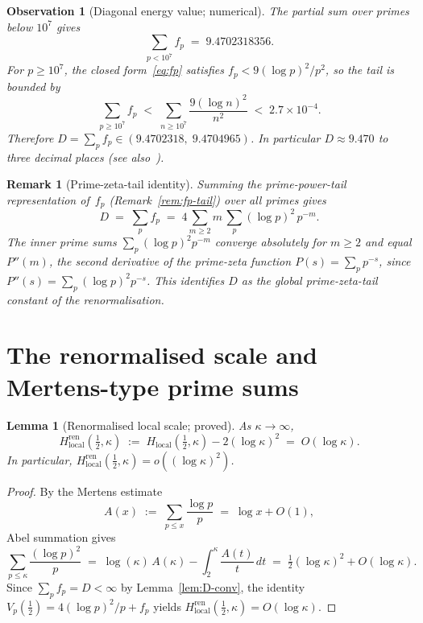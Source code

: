 \documentclass[11pt]{article}
\newtheorem{lemma}[theorem]{Lemma}
\newtheorem{observation}[theorem]{Observation}
\newtheorem*{remark}{Remark}
\newcommand{\Hlocal}{H_{\mathrm{local}}}
\newcommand{\Hren}{H_{\mathrm{local}}^{\mathrm{ren}}}
\begin{document}
\begin{observation}[Diagonal energy value; numerical]\label{obs:D-value}
The partial sum over primes below $10^7$ gives
\[
\sum_{p<10^7} f_p \;=\; 9.4702318356.
\]
For $p\ge 10^7$, the closed form~\eqref{eq:fp} satisfies
$f_p < 9(\log p)^2/p^2$, so the tail is bounded by
\[
\sum_{p\ge 10^7} f_p
\;<\; \sum_{n\ge 10^7}\frac{9(\log n)^2}{n^2}
\;<\; 2.7\times 10^{-4}.
\]
Therefore $D = \sum_p f_p \in (9.4702318,\;9.4704965)$.
In particular $D\approx 9.470$ to three decimal places
(see also~\cite{Code}).
\end{observation}

\begin{remark}[Prime-zeta-tail identity]\label{rem:D-primezeta}
Summing the prime-power-tail representation of~$f_p$
(Remark~\ref{rem:fp-tail}) over all primes gives
\[
D
\;=\;
\sum_p f_p
\;=\;
4\sum_{m\ge2}m\,\sum_p(\log p)^2\,p^{-m}.
\]
The inner prime sums $\sum_p(\log p)^2 p^{-m}$ converge
absolutely for $m\ge 2$ and equal $P''(m)$, the second
derivative of the prime-zeta function
$P(s)=\sum_p p^{-s}$, since
$P''(s) = \sum_p(\log p)^2 p^{-s}$.
This identifies $D$ as the global prime-zeta-tail constant
of the renormalisation.
\end{remark}

\section{The renormalised scale and Mertens-type prime sums}
\label{sec:scale}

\begin{lemma}[Renormalised local scale; proved]\label{lem:ren-scale}
As $\kappa\to\infty$,
\[
\Hren(\tfrac12,\kappa)
\;:=\;
\Hlocal(\tfrac12,\kappa) - 2(\log\kappa)^2
\;=\; O(\log\kappa).
\]
In particular,
$\Hren(\tfrac12,\kappa) = o((\log\kappa)^2)$.
\end{lemma}

\begin{proof}
By the Mertens estimate
\[
A(x) \;:=\; \sum_{p\le x}\frac{\log p}{p}
\;=\; \log x + O(1),
\]
Abel summation gives
\[
\sum_{p\le\kappa}\frac{(\log p)^2}{p}
\;=\; \log(\kappa)\,A(\kappa)
- \int_2^{\kappa}\frac{A(t)}{t}\,dt
\;=\; \tfrac12(\log\kappa)^2 + O(\log\kappa).
\]
Since $\sum_p f_p = D<\infty$ by Lemma~\ref{lem:D-conv},
the identity $V_p(\tfrac12)=4(\log p)^2/p + f_p$ yields
$\Hren(\tfrac12,\kappa) = O(\log\kappa)$.
\end{proof}
\end{document}
